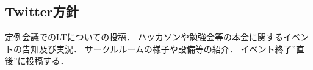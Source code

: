 \subsection*{Twitter方針}

定例会議でのLTについての投稿．
ハッカソンや勉強会等の本会に関するイベントの告知及び実況．
サークルルームの様子や設備等の紹介．
イベント終了”直後”に投稿する．
